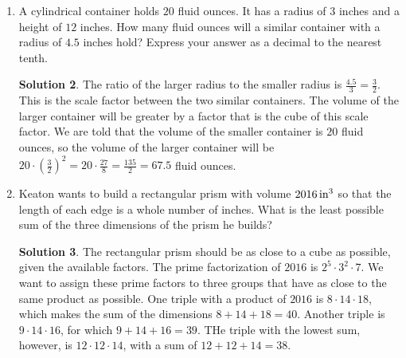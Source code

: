 \documentclass{article}
\theoremstyle{definition}
\newtheorem*{solution}{Solution}
\begin{document}
\begin{multicols}{2}
\begin{enumerate}
\begin{solution}
                It will take $1728 \div 12 = 144$ prisms to fill the cube.
            \end{solution}
        \item A cylindrical container holds $20$ fluid ounces.
            It has a radius of $3$ inches and a height of $12$ inches.
            How many fluid ounces will a similar container with a radius of $4.5$ inches hold?
            Express your answer as a decimal to the nearest tenth.
            \begin{solution}
                The ratio of the larger radius to the smaller radius is $\frac{4.5}{3} = \frac{3}{2}$.
                This is the scale factor between the two similar containers.
                The volume of the larger container will be greater by a factor that is the cube of this scale factor.
                We are told that the volume of the smaller container is $20$ fluid ounces, so the volume of the larger container will be $20 \cdot \left( \frac{3}{2} \right)^2 = 20 \cdot \frac{27}{8} = \frac{135}{2} = 67.5$ fluid ounces.
            \end{solution}
        \item Keaton wants to build a rectangular prism with volume $\SI{2016}{in\cubed}$ so that the length of each edge is a whole number of inches.
            What is the least possible sum of the three dimensions of the prism he builds?
            \begin{solution}
                The rectangular prism should be as close to a cube as possible, given the available factors.
                The prime factorization of $2016$ is $2^5 \cdot 3^2 \cdot 7$.
                We want to assign these prime factors to three groups that have as close to the same product as possible.
                One triple with a product of $2016$ is $8 \cdot 14 \cdot 18$, which makes the sum of the dimensions $8 + 14 + 18 = 40$.
                Another triple is $9 \cdot 14 \cdot 16$, for which $9 + 14 + 16 = 39$.
                THe triple with the lowest sum, however, is $12 \cdot 12 \cdot 14$, with a sum of $12 + 12 + 14 =38$.
            \end{solution}
    \end{enumerate}
\end{multicols}
\end{document}

